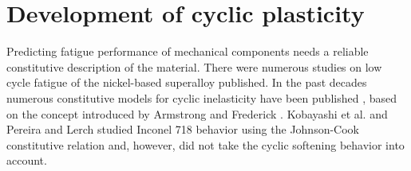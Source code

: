 

\section{Development of cyclic plasticity}
\noindent
Predicting fatigue performance of mechanical components needs a reliable constitutive description of the material. There were numerous studies on low cycle fatigue of the nickel-based superalloy published. In the past decades numerous constitutive models for cyclic inelasticity have been published \cite{ohno1993kinematic, Pun2014138, AbdelKarim2000225, Kang2004299}, based on the concept introduced by Armstrong and Frederick \cite{armstrong1966mathematical}. Kobayashi et al. \cite{Kobayashi2008389} and Pereira and Lerch \cite{Pereira2001715} studied Inconel 718 behavior using the Johnson-Cook constitutive relation and, however, did not take the cyclic softening behavior into account. 

